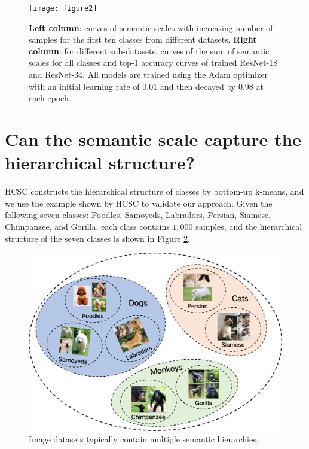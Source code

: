 \documentclass[10pt]{article} %
\begin{document}
\begin{figure}[h]%
\begin{center}
\vskip -0.05in
\texttt{[image: figure2]}
\vskip -0.15in
\caption{\textbf{Left column}: curves of semantic scales with increasing number of samples for the first ten classes from different datasets. \textbf{Right column}: for different sub-datasets, curves of the sum of semantic scales for all classes and top-1 accuracy curves of trained ResNet-18 and ResNet-34. All models are trained using the Adam optimizer \cite {paper33} with an initial learning rate of $0.01$ and then decayed by $0.98$ at each epoch.}
\label{fig26}
\end{center}
\vskip -0.3in
\end{figure}

\section{Can the semantic scale capture the hierarchical structure?\label{L}}

HCSC \cite{paper118} constructs the hierarchical structure of classes by bottom-up k-means, and we use the example shown by HCSC to validate our approach. Given the following seven classes: Poodles, Samoyeds, Labradors, Persian, Siamese, Chimpanzee, and Gorilla, each class contains $1,000$ samples, and the hierarchical structure of the seven classes is shown in Figure \ref{fig27}.

\begin{figure}[h]%
\begin{center}
\includegraphics[width=0.65\columnwidth]{fig25}
\vskip -0.05in
\caption{Image datasets typically contain multiple semantic hierarchies.}
\label{fig27}
\end{center}
\vskip -0.14in
\end{figure}
\end{document}
